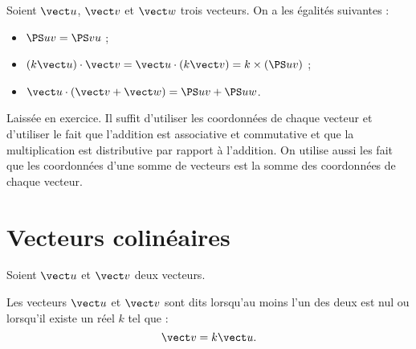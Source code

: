 \documentclass[10pt,openright,twoside,french]{book}
\begin{document}
\begin{Prop}\label{Prop_PS}
    Soient $\vect u$, $\vect v$ et $\vect w$ trois vecteurs.
    On a les égalités suivantes :
    \begin{itemize}
        \item $\PS u v = \PS v u$ ;
        \item $\left(k\vect u\right) \cdot \vect v = \vect u \cdot \left(k\vect v\right) = k \times \left(\PS u v\right)$ ;
        \item $\vect u \cdot \left(\vect v + \vect w\right) = \PS u v + \PS u w$.
    \end{itemize}
\end{Prop}

\begin{Demo}
    Laissée en exercice.
    Il suffit d'utiliser les coordonnées de chaque vecteur et d'utiliser le fait que l'addition est associative et commutative et que la multiplication est distributive par rapport à l'addition.
    On utilise aussi les fait que les coordonnées d'une somme de vecteurs est la somme des coordonnées de chaque vecteur.
\end{Demo}

\section{Vecteurs colinéaires}

\begin{Defi}
    Soient $\vect u$ et $\vect v$ deux vecteurs.\par
    Les vecteurs $\vect u$ et $\vect v$ sont dits  lorsqu'au moins l'un des deux est nul ou lorsqu'il existe un réel $k$ tel que :
    \[\vect v = k\vect u.\]

    \begin{center}
    \end{center}
\end{Defi}
\end{document}
